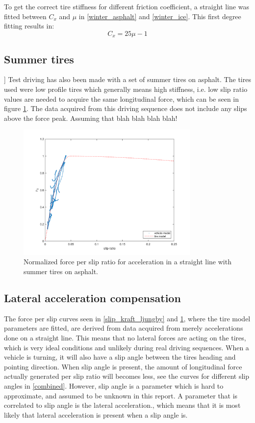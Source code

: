 To get the correct tire stiffness for different friction coefficient, a straight line was fitted between $ C_{x} $ and $ \mu $ in \ref{winter_asphalt} and \ref{winter_ice}. This first degree fitting results in:
\begin{equation}
	C_{x} = 25\mu - 1
\end{equation}

\subsection{Summer tires}
\label{summer_tire}]
Test driving has also been made with a set of summer tires on asphalt. The tires used were low profile tires which generally means high stiffness, i.e. low slip ratio values are needed to acquire the same longitudinal force, which can be seen in figure \ref{slip_kraft_bb_torr}. The data acquired from this driving sequence does not include any slips above the force peak. Assuming that blah blah blah blah!
\begin{figure}[h]
	\centering
	\includegraphics[width=0.8\textwidth]{Pictures/slip_kraft_bb_torr}
	\caption {Normalized force per slip ratio for acceleration in a straight line with summer tires on asphalt.}
	\label{slip_kraft_bb_torr}
\end{figure}

\subsection{Lateral acceleration compensation}
\label{sec:latacccomp}
The force per slip curves seen in \ref{slip_kraft_ljungby} and \ref{slip_kraft_bb_torr}, where the tire model parameters are fitted, are derived from data acquired from merely accelerations done on a straight line. This means that no lateral forces are acting on the tires, which is very ideal conditions and unlikely during real driving sequences. When a vehicle is turning, it will also have a slip angle between the tires heading and pointing direction. When slip angle is present, the amount of longitudinal force actually generated per slip ratio will becomes less, see the curves for different slip angles in \ref{combined}. However, slip angle is a parameter which is hard to approximate, and assumed to be unknown in this report. A parameter that is correlated to slip angle is the lateral acceleration., which means that it is most likely that lateral acceleration is present when a slip angle is. 
 
